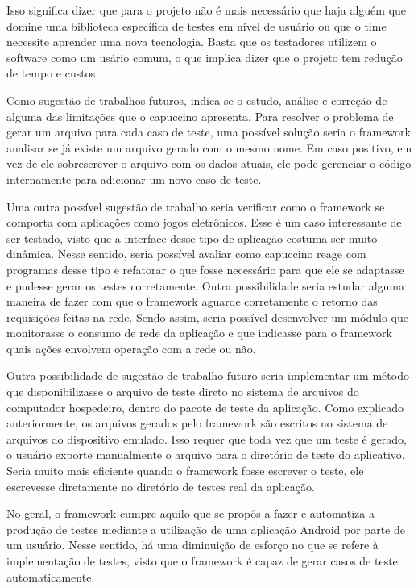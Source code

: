 \documentclass[
    12pt,       %
    openright,      %
    twoside,      %
    a4paper,      %
    english,      %
    french,       %
    spanish,      %
    brazil,       %
    ]{abntex2}
\begin{document}
      Isso significa dizer que para o projeto não é mais necessário que haja alguém que domine uma biblioteca
      específica de testes em nível de usuário ou que o time necessite aprender uma nova tecnologia. Basta
      que os testadores utilizem o software como um usário comum, o que implica dizer que o projeto tem
      redução de tempo e custos.

      Como sugestão de trabalhos futuros, indica-se o estudo, análise e correção de alguma das limitações
      que o capuccino apresenta. Para resolver o problema de gerar um arquivo para cada caso de teste,
      uma possível solução seria o framework analisar se já existe um arquivo gerado com o mesmo nome. Em
      caso positivo, em vez de ele sobrescrever o arquivo com os dados atuais, ele pode gerenciar o código
      internamente para adicionar um novo caso de teste.

      Uma outra possível sugestão de trabalho seria verificar como o framework se comporta com aplicações
      como jogos eletrônicos. Esse é um caso interessante de ser testado, visto que a interface desse
      tipo de aplicação costuma ser muito dinâmica. Nesse sentido, seria possível avaliar como capuccino
      reage com programas desse tipo e refatorar o que fosse necessário para que ele se adaptasse e pudesse
      gerar os testes corretamente. Outra possibilidade seria estudar alguma maneira de fazer com que o
      framework aguarde corretamente o retorno das requisições feitas na rede. Sendo assim, seria possível
      desenvolver um módulo que monitorasse o consumo de rede da aplicação e que indicasse para o framework
      quais ações envolvem operação com a rede ou não.

      Outra possibilidade de sugestão de trabalho futuro seria implementar um método que disponibilizasse o
      arquivo de teste direto no sistema de arquivos do computador hospedeiro, dentro do pacote de teste
      da aplicação. Como explicado anteriormente, os arquivos gerados pelo framework são escritos no sistema
      de arquivos do dispositivo emulado. Isso requer que toda vez que um teste é gerado, o usuário exporte
      manualmente o arquivo para o diretório de teste do aplicativo. Seria muito mais eficiente quando o
      framework fosse escrever o teste, ele escrevesse diretamente no diretório de testes real da aplicação.

      No geral, o framework cumpre aquilo que se propôs a fazer e automatiza a produção de testes
      mediante a utilização de uma aplicação Android por parte de um usuário. Nesse sentido, há uma diminuição
      de esforço no que se refere à implementação de testes, visto que o framework é capaz de gerar casos de teste
      automaticamente.
\end{document}
